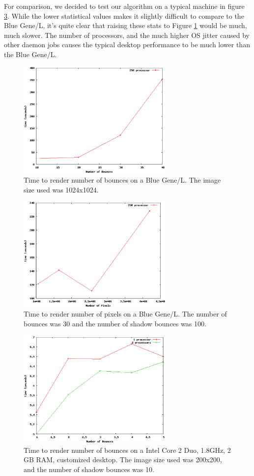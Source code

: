 \documentclass{acmsiggraph}
\begin{document}
For comparison, we decided to test our algorithm on a typical machine in figure 
\ref{plot_taro_desktop}.  While the lower statistical values makes it slightly
difficult to compare to the Blue Gene/L, it's quite clear that raising these stats
to Figure \ref{plot_bgl_bounces} would be much, much slower.  The number of processors,
and the much higher OS jitter caused by other daemon jobs causes the typical desktop
performance to be much lower than the Blue Gene/L.

\begin{figure}[htp]
\centering
\includegraphics[width=3in]{blue_gene_bounces_plot}
\caption{Time to render number of bounces on a Blue Gene/L. The image size used was 1024x1024.}
\label{plot_bgl_bounces}
\end{figure}

\begin{figure}[htp]
\centering
\includegraphics[width=3in]{blue_gene_pixels_plot}
\caption{Time to render number of pixels on a Blue Gene/L. The number of bounces was 30 and the number of shadow bounces was 100.}
\label{plot_bgl_pixels}
\end{figure}

\begin{figure}[htp]
\centering
\includegraphics[width=3in]{taro_desktop_plot}
\caption{Time to render number of bounces on a Intel Core 2 Duo, 1.8GHz, 2 GB RAM, customized desktop. The image size used was 200x200, and the number of shadow bounces was 10.}
\label{plot_taro_desktop}
\end{figure}
\end{document}

